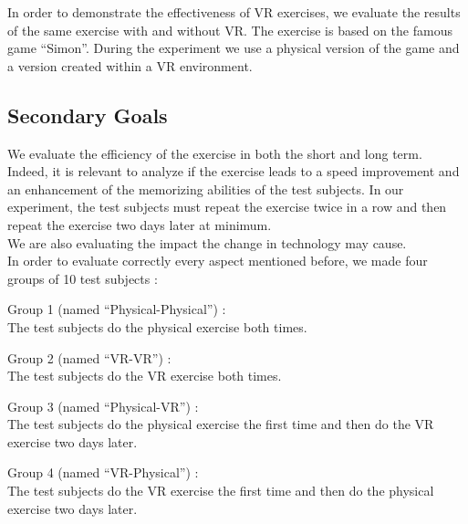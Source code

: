 \documentclass[12pt, openany, twocolumn]{article}
\begin{document}
    In order to demonstrate the effectiveness of VR exercises, we evaluate the results of the same exercise with and without VR. The exercise is based on the famous game “Simon”. 
    During the experiment we use a physical version of the game and a version created within a VR environment.

    \subsection{Secondary Goals}
    We evaluate the efficiency of the exercise in both the short and long term.
    Indeed, it is relevant to analyze if the exercise leads to a speed improvement and an enhancement of the memorizing abilities of the test subjects.
    In our experiment, the test subjects must repeat the exercise twice in a row and then repeat the exercise two days later at minimum. \\
    We are also evaluating the impact the change in technology may cause.
    \\

    In order to evaluate correctly every aspect mentioned before, we made four groups of 10 test subjects :
    \begin{description}
        \item{Group 1 (named ``Physical-Physical'') :} \\
        The test subjects do the physical exercise both times.
        \item{Group 2 (named ``VR-VR'') :} \\
        The test subjects do the VR exercise both times.
        \item{Group 3 (named ``Physical-VR'') :} \\
        The test subjects do the physical exercise the first time and then do the VR exercise two days later.
        \item{Group 4 (named ``VR-Physical'') :} \\
        The test subjects do the VR exercise the first time and then do the physical exercise two days later.
    \end{description}


\end{document}
